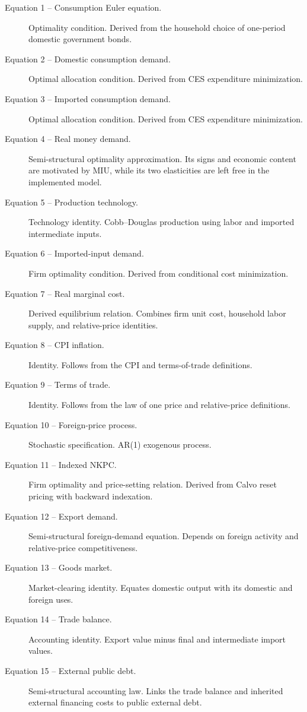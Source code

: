 \begin{description}
\item[Equation 1 -- Consumption Euler equation.] Optimality condition. Derived from the household choice of one-period domestic government bonds.
\item[Equation 2 -- Domestic consumption demand.] Optimal allocation condition. Derived from CES expenditure minimization.
\item[Equation 3 -- Imported consumption demand.] Optimal allocation condition. Derived from CES expenditure minimization.
\item[Equation 4 -- Real money demand.] Semi-structural optimality approximation. Its signs and economic content are motivated by MIU, while its two elasticities are left free in the implemented model.
\item[Equation 5 -- Production technology.] Technology identity. Cobb--Douglas production using labor and imported intermediate inputs.
\item[Equation 6 -- Imported-input demand.] Firm optimality condition. Derived from conditional cost minimization.
\item[Equation 7 -- Real marginal cost.] Derived equilibrium relation. Combines firm unit cost, household labor supply, and relative-price identities.
\item[Equation 8 -- CPI inflation.] Identity. Follows from the CPI and terms-of-trade definitions.
\item[Equation 9 -- Terms of trade.] Identity. Follows from the law of one price and relative-price definitions.
\item[Equation 10 -- Foreign-price process.] Stochastic specification. AR(1) exogenous process.
\item[Equation 11 -- Indexed NKPC.] Firm optimality and price-setting relation. Derived from Calvo reset pricing with backward indexation.
\item[Equation 12 -- Export demand.] Semi-structural foreign-demand equation. Depends on foreign activity and relative-price competitiveness.
\item[Equation 13 -- Goods market.] Market-clearing identity. Equates domestic output with its domestic and foreign uses.
\item[Equation 14 -- Trade balance.] Accounting identity. Export value minus final and intermediate import values.
\item[Equation 15 -- External public debt.] Semi-structural accounting law. Links the trade balance and inherited external financing costs to public external debt.

\end{description}
